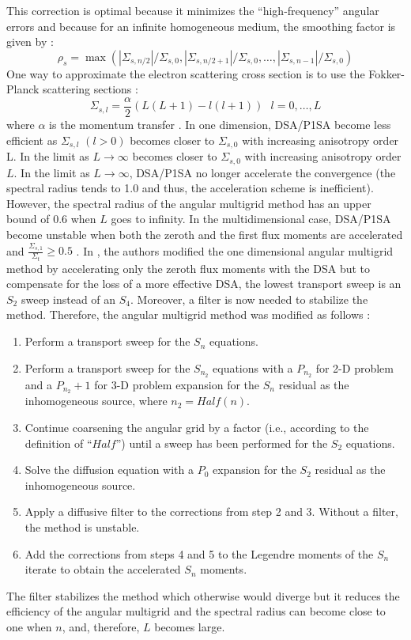 This correction is optimal because it minimizes the ``high-frequency'' angular
errors and because for an infinite homogeneous medium, the smoothing factor is
given by :
\begin{equation}
\rho_s =
\max(|\Sigma_{s,n/2}|/\Sigma_{s,0},|\Sigma_{s,n/2+1}|/\Sigma_{s,0},\hdots,
|\Sigma_{s,n-1}|/\Sigma_{s,0})
\end{equation}
One way to approximate the electron scattering cross section is to use the
Fokker-Planck scattering sections :
\begin{equation}
\Sigma_{s,l} = \frac{\alpha}{2} (L(L+1)-l(l+1))\ \ \ l=0,\hdots,L
\end{equation}
where $\alpha$ is the momentum transfer \cite{morel_81}. In one dimension,
DSA/P1SA become less efficient as $\Sigma_{s,l}$ $(l>0)$ becomes closer to
$\Sigma_{s,0}$ with increasing anisotropy order L. In the limit as
$L\rightarrow \infty$ becomes closer to $\Sigma_{s,0}$ with increasing
anisotropy order $L$. In the limit as $L\rightarrow \infty$, DSA/P1SA no
longer accelerate the convergence (the spectral radius tends to 1.0 and thus,
the acceleration scheme is inefficient).  However, the spectral radius of the
angular multigrid method has an upper bound of 0.6 when $L$ goes to infinity.
In the multidimensional case, DSA/P1SA become unstable when both the zeroth
and the first flux moments are accelerated and $\frac{\Sigma_{s,1}}{\Sigma_t}
\geq 0.5$ \cite{multisweep}. In \cite{multigrid_2d}, the authors modified the
one dimensional angular multigrid method by accelerating only the zeroth flux
moments with the DSA but to compensate for the loss of a more effective DSA,
the lowest transport sweep is an $S_2$ sweep instead of an $S_4$. Moreover, a
filter is now needed to stabilize the method. Therefore, the angular multigrid 
method was modified as follows \cite{multigrid_2d} :
\begin{enumerate}
\item Perform a transport sweep for the $S_n$ equations.
\item Perform a transport sweep for the $S_{n_2}$ equations with a $P_{n_2}$
for 2-D problem and a $P_{n_2}+1$ for 3-D problem expansion for the $S_n$
residual as the inhomogeneous source, where $n_2=Half(n)$.
\item Continue coarsening the angular grid by a factor (i.e., according to the
definition of ``$Half$'') until a sweep has been performed for the $S_2$
equations.
\item Solve the diffusion equation with a $P_0$ expansion for the $S_2$
residual as the inhomogeneous source. 
\item Apply a diffusive filter to the corrections from step 2 and 3. Without a
filter, the method is unstable.
\item Add the corrections from steps 4 and 5 to the Legendre moments of the
$S_n$ iterate to obtain the accelerated $S_n$ moments.
\end{enumerate}
The filter stabilizes the method which otherwise would diverge but it reduces
the efficiency of the angular multigrid and the spectral radius can become
close to one when $n$, and, therefore, $L$ becomes large.
